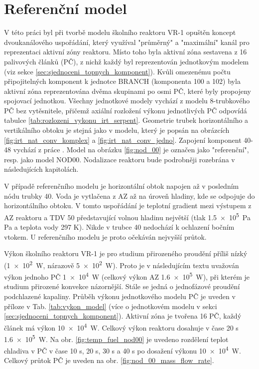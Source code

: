 \section{Referenční model}
\label{sec:referencni_model}
V této práci \cite{fejt} byl při tvorbě modelu školního reaktoru VR-1 opuštěn koncept dvoukanálového uspořádání, který využíval "průměrný" a "maximální" kanál pro reprezentaci aktivní zóny reaktoru. Místo toho byla aktivní zóna sestavena z 16 palivových článků (PČ), z nichž každý byl reprezentován jednotkovým modelem (viz sekce \ref{sec:sjednoceni_topnych_komponent}). Kvůli omezenému počtu připojitelných komponent k jednotce BRANCH (komponenta 100 a 102) byla aktivní zóna reprezentována dvěma skupinami po osmi PČ, které byly propojeny spojovací jednotkou. Všechny jednotkové modely vychází z modelu 8-trubkového PČ bez vytěsnitele, přičemž axiální rozložení výkonu jednotlivých PČ odpovídá tabulce \ref{tab:rozlozeni_vykonu_irt_serpent}. Geometrie trubek horizontálního a vertikálního obtoku je stejná jako v modelu, který je popsán na obrázcích \ref{fig:irt_nat_conv_komplex} a \ref{fig:irt_nat_conv_jedno}. Zapojení komponent 40-48 vychází z práce \cite{fejt}. Model na obrázku \ref{fig:nod_00} je označen jako "referenční", resp. jako model NOD00. Nodalizace reaktoru bude podrobněji rozebrána v následujících kapitolách.

V případě referenčního modelu je horizontální obtok napojen až v posledním nódu trubky 40. Voda je vytlačena z AZ až na úroveň hladiny, kde se odpojuje do horizontálního obtoku. V tomto uspořádání je teplotní gradient mezi výstupem z AZ reaktoru a TDV 50 představující volnou hladinu největší (tlak \SI{1,5e5}{\pascal} Pa a teplota vody 297 K). Nikde v trubce 40 nedochází k ochlazení bočním vtokem. U referenčního modelu je proto očekáván nejvyšší průtok.

Výkon školního reaktoru VR-1 je pro studium přirozeného proudění příliš nízký (\SI{1e2}{\watt}, nárazově \SI{5e2}{\watt}). Proto je v následujícím textu uvažován výkon jednoho PČ \SI{1e4}{W} (celkový výkon AZ \SI{1,6e5}{\watt}), při kterém je studium přirozené konvekce názornější. Stále se jedná o jednofázové proudění podchlazené kapaliny. Průběh výkonu jednotkového modelu PČ je uveden v příloze v Tab. \ref{tab:vykon_model} (více o jednotkovém modelu v sekci \ref{sec:sjednoceni_topnych_komponent}). Aktivní zóna je tvořena 16 PČ, každý článek má výkon \SI{10e4}{\watt}. Celkový výkon reaktoru dosahuje v čase 20 s \SI{1,6e5}{\watt}. Na obr. \ref{fig:temp_fuel_nod00} je uvedeno rozdělení teplot chladiva v PČ v čase 10 s, 20 s, 30 s a 40 s po dosažení výkonu \SI{10e4}{\watt}. Celkový průtok PČ je uveden na obr. \ref{fig:nod_00_mass_flow_rate}.
